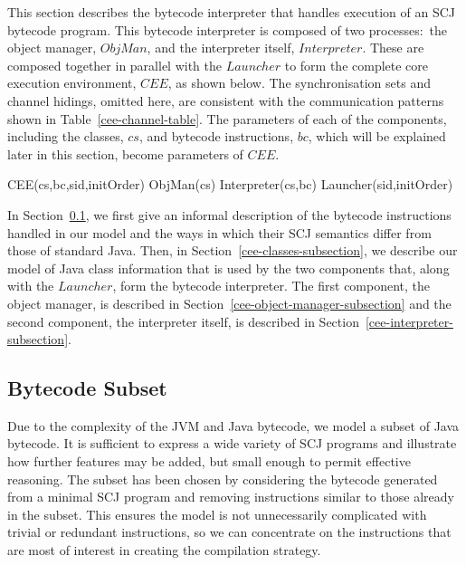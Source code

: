 This section describes the bytecode interpreter that handles execution
of an SCJ bytecode program.
This bytecode interpreter is composed of two processes:~the object
manager, $ObjMan$, and the interpreter itself, $Interpreter$.
These are composed together in parallel with the $Launcher$ to form
the complete core execution environment, $CEE$, as shown below.
The synchronisation sets and channel hidings, omitted here, are
consistent with the communication patterns shown in
Table~\ref{cee-channel-table}.
The parameters of each of the components, including the classes, $cs$,
and bytecode instructions, $bc$, which will be explained later in this
section, become parameters of $CEE$.
\begin{circus}
  CEE(cs,bc,sid,initOrder) \circdef ObjMan(cs) \parallel
  Interpreter(cs,bc) \parallel Launcher(sid,initOrder)
\end{circus}

In Section~\ref{cee-bytecode-subset-subsection}, we first give an
informal description of the bytecode instructions handled in our model
and the ways in which their SCJ semantics differ from those of
standard Java.
Then, in Section~\ref{cee-classes-subsection}, we describe our model
of Java class information that is used by the two components that,
along with the $Launcher$, form the bytecode interpreter.
The first component, the object manager, is described in
Section~\ref{cee-object-manager-subsection} and the second component,
the interpreter itself, is described in
Section~\ref{cee-interpreter-subsection}.

\subsection{Bytecode Subset}
\label{cee-bytecode-subset-subsection}

Due to the complexity of the JVM and Java bytecode, we model a subset
of Java bytecode.
It is sufficient to express a wide variety of SCJ programs and
illustrate how further features may be added, but small enough to
permit effective reasoning.
The subset has been chosen by considering the bytecode generated from
a minimal SCJ program and removing instructions similar to those
already in the subset.
This ensures the model is not unnecessarily complicated with trivial
or redundant instructions, so we can concentrate on the instructions
that are most of interest in creating the compilation strategy.

